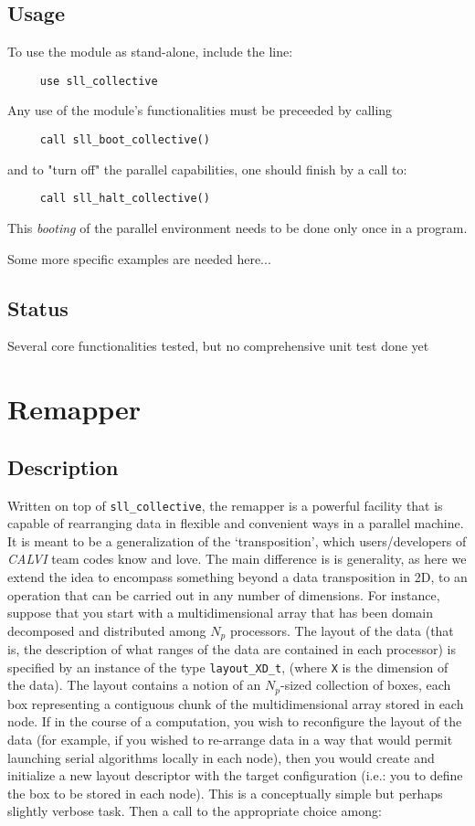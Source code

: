 \documentclass[]{report}   %
\begin{document}
\subsection{Usage}
To use the module as stand-alone, include the line:
\begin{verbatim}
     use sll_collective
\end{verbatim}
Any use of the module's functionalities must be preceeded by calling
\begin{verbatim}
     call sll_boot_collective()
\end{verbatim}
and to "turn off" the parallel capabilities, one should finish by a call to:
\begin{verbatim}
     call sll_halt_collective()
\end{verbatim}
This \emph{booting} of the parallel environment needs to be done only once in a program.

Some more specific examples are needed here...
\subsection{Status}
Several core functionalities tested, but no comprehensive unit test done yet

\section{Remapper}

\subsection{Description}
Written on top of \verb+sll_collective+, the remapper is a powerful facility that is capable of rearranging data in flexible and convenient ways in a parallel machine. It is meant to be a generalization of the `transposition', which users/developers of \emph{CALVI} team codes know and love. The main difference is is generality, as here we extend the idea to encompass something beyond a data transposition in 2D, to an operation that can be carried out in any number of dimensions. For instance, suppose that you start with a multidimensional array that has been domain decomposed and distributed among $N_p$ processors. The  layout of the data (that is, the description of what ranges of the data are contained in each processor) is specified by an instance of the type \verb+layout_XD_t+, (where \verb+X+ is the dimension of the data). The layout contains a notion of an $N_p$-sized collection of boxes, each box representing a contiguous chunk of the multidimensional array stored in each  node. If in the course of a computation, you wish to reconfigure the layout of the data (for example, if you wished to re-arrange data in a way that would permit launching serial algorithms locally in each node), then you would create and initialize a new layout descriptor with the target configuration (i.e.: you to define the box to be stored in each node). This is a conceptually simple but perhaps slightly verbose task. Then a call to the appropriate choice among:
\end{document}
